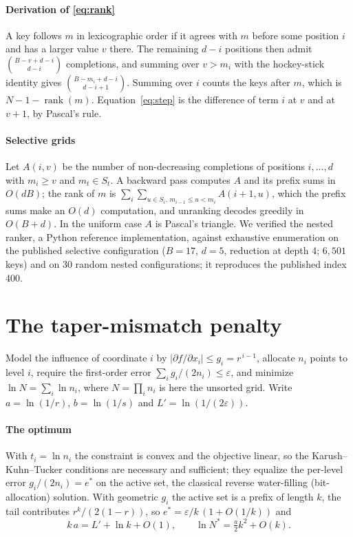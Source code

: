 \documentclass[preprint,12pt]{elsarticle}
\newcommand{\rank}{\operatorname{rank}}
\newcommand{\eps}{\varepsilon}
\begin{document}
\paragraph{Derivation of \eqref{eq:rank}} A key follows $m$ in lexicographic order
if it agrees with $m$ before some position $i$ and has a larger value $v$ there.
The remaining $d-i$ positions then admit $\binom{B-v+d-i}{d-i}$ completions, and
summing over $v>m_i$ with the hockey-stick identity gives
$\binom{B-m_i+d-i}{d-i+1}$. Summing over $i$ counts the keys after $m$, which is
$N-1-\rank(m)$. Equation~\eqref{eq:step} is the difference of term $i$ at $v$ and
at $v{+}1$, by Pascal's rule.

\paragraph{Selective grids} Let $A(i,v)$ be the number of non-decreasing
completions of positions $i,\dots,d$ with $m_i\ge v$ and $m_t\in S_t$. A backward
pass computes $A$ and its prefix sums in $O(dB)$; the rank of $m$ is
$\sum_i\sum_{u\in S_i,\,m_{i-1}\le u<m_i}A(i{+}1,u)$, which the prefix sums make
an $O(d)$ computation, and unranking decodes greedily in $O(B+d)$. In the uniform case $A$ is
Pascal's triangle. We verified the nested ranker, a Python reference
implementation, against exhaustive enumeration on
the published selective configuration ($B=17$, $d=5$, reduction at depth 4;
$6{,}501$ keys) and on 30 random nested configurations; it reproduces the
published index 400.

\section{The taper-mismatch penalty}\label{app:penalty}

Model the influence of coordinate $i$ by $|\partial f/\partial x_i|\le
g_i=r^{\,i-1}$, allocate $n_i$ points to level $i$, require the first-order error
$\sum_i g_i/(2n_i)\le\eps$, and minimize $\ln N=\sum_i\ln n_i$, where $N=\prod_i n_i$ is here the unsorted grid. Write
$a=\ln(1/r)$, $b=\ln(1/s)$ and $L'=\ln(1/(2\eps))$.

\paragraph{The optimum} With $t_i=\ln n_i$ the constraint is convex and the
objective linear, so the Karush--Kuhn--Tucker conditions are necessary and
sufficient; they equalize the per-level error $g_i/(2n_i)=e^\ast$ on the active
set, the classical reverse water-filling (bit-allocation)
solution.\cite{huang1963,gersho1992} With geometric $g_i$ the active set is a
prefix of length $k$, the tail contributes $r^k/(2(1-r))$, so
$e^\ast=\eps/k\,(1+O(1/k))$ and
\begin{equation}\label{eq:kfix}
k\,a=L'+\ln k+O(1),\qquad \ln N^\ast=\tfrac{a}{2}k^2+O(k).
\end{equation}
\end{document}
